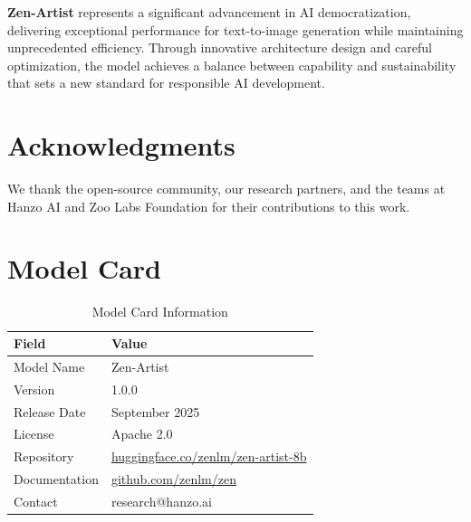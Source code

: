 \documentclass[11pt,a4paper]{article}
\begin{document}
\textbf{Zen-Artist} represents a significant advancement in AI democratization, 
delivering exceptional performance for text-to-image generation while maintaining 
unprecedented efficiency. Through innovative architecture design and careful optimization, 
the model achieves a balance between capability and sustainability that sets a new standard 
for responsible AI development.

\section*{Acknowledgments}

We thank the open-source community, our research partners, and the teams at Hanzo AI and 
Zoo Labs Foundation for their contributions to this work.

\appendix

\section{Model Card}

\begin{table}[H]
\centering
\begin{tabular}{ll}
\toprule
\textbf{Field} & \textbf{Value} \\
\midrule
Model Name & Zen-Artist \\
Version & 1.0.0 \\
Release Date & September 2025 \\
License & Apache 2.0 \\
Repository & \href{https://huggingface.co/zenlm/zen-artist-8b}{huggingface.co/zenlm/zen-artist-8b} \\
Documentation & \href{https://github.com/zenlm/zen}{github.com/zenlm/zen} \\
Contact & research@hanzo.ai \\
\bottomrule
\end{tabular}
\caption{Model Card Information}
\end{table}
\end{document}
